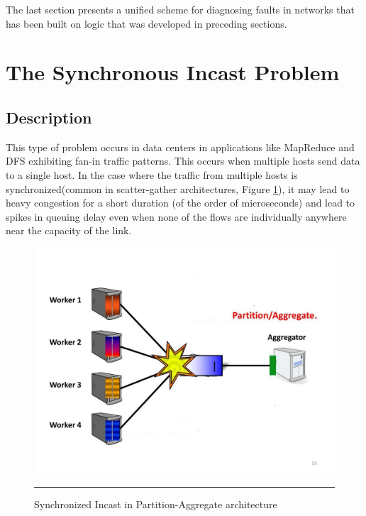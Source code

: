The last section presents a unified scheme for diagnosing faults in networks that has been built on logic that was developed
in preceding sections.
\section{The Synchronous Incast Problem}

\subsection{Description}

This type of problem occurs in data centers in applications like MapReduce and DFS exhibiting fan-in traffic patterns.
This occurs when multiple hosts send data to a single host. In the case where the traffic from multiple hosts is
synchronized(common in scatter-gather architectures, Figure \ref{fig:Synch Incast}), it may lead to heavy congestion for a short duration (of the
order of microseconds) and lead to spikes in queuing delay even when none of the flows are individually anywhere near
the capacity of the link.

\begin{figure}[htbp]
	\centering
		\includegraphics[width=0.65\columnwidth]{Figures/sync_incast.jpg}
		\rule{35em}{0.5pt}
	\caption[Synchronized Incast]{Synchronized Incast in Partition-Aggregate architecture}
	\label{fig:Synch Incast}
\end{figure}

